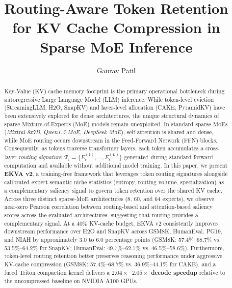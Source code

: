 \documentclass[runningheads]{llncs}
\begin{document}
\title{Routing-Aware Token Retention for KV Cache Compression in Sparse MoE Inference}

\author{Gaurav Patil}

\maketitle

\begin{abstract}
Key-Value (KV) cache memory footprint is the primary operational bottleneck during autoregressive Large Language Model (LLM) inference. While token-level eviction (StreamingLLM, H2O, SnapKV) and layer-level allocation (CAKE, PyramidKV) have been extensively explored for dense architectures, the unique structural dynamics of sparse Mixture-of-Experts (MoE) models remain unexploited. In standard sparse MoEs (\emph{Mixtral-8x7B}, \emph{Qwen1.5-MoE}, \emph{DeepSeek-MoE}), self-attention is shared and dense, while MoE routing occurs downstream in the Feed-Forward Network (FFN) blocks. Consequently, as tokens traverse transformer layers, each token accumulates a cross-layer \emph{routing signature} $\mathcal{R}_t = \{E_t^{(1)}, \dots, E_t^{(L)}\}$ generated during standard forward computation and available without additional model training. In this paper, we present \textbf{EKVA v2}, a training-free framework that leverages token routing signatures alongside calibrated expert semantic niche statistics (entropy, routing volume, specialization) as a complementary saliency signal to govern token retention over the shared KV cache. Across three distinct sparse-MoE architectures (8, 60, and 64 experts), we observe near-zero Pearson correlation between routing-based and attention-based saliency scores across the evaluated architectures, suggesting that routing provides a complementary signal. At a 40\% KV-cache budget, EKVA v2 consistently improves downstream performance over H2O and SnapKV across GSM8K, HumanEval, PG19, and NIAH by approximately 3.0 to 6.0 percentage points (GSM8K: 57.4\%--68.7\% vs. 53.5\%--64.2\% for SnapKV; HumanEval: 49.7\%--62.7\% vs. 46.5\%--58.6\%). Furthermore, token-level routing retention better preserves reasoning performance under aggressive KV-cache compression (GSM8K: 57.4\%--68.7\% vs. 36.9\%--44.1\% for CAKE), and a fused Triton compaction kernel delivers a \textbf{$2.04\times$--$2.05\times$ decode speedup} relative to the uncompressed baseline on NVIDIA A100 GPUs.

\end{abstract}
\end{document}
